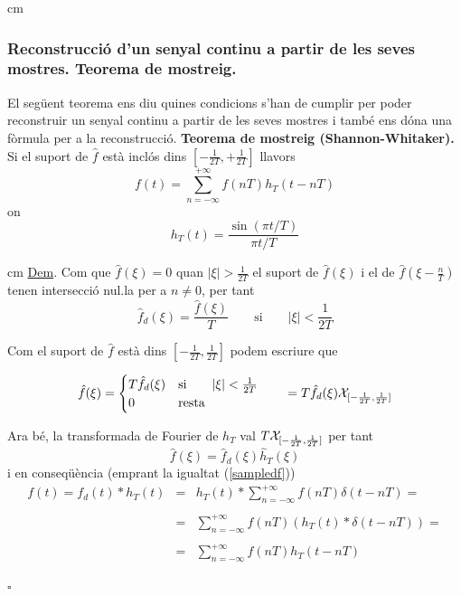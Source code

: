 \documentclass{article}
\begin{document}
 cm
\subsubsection{Reconstrucci\'o d'un senyal continu a partir de les
seves mostres. Teorema de mostreig.}
El seg\"uent teorema ens diu quines condicions s'han de cumplir per
poder reconstruir un senyal continu a partir de les seves mostres
i tamb\'e ens d\'ona una f\`ormula per a la reconstrucci\'o.
\newline
\noindent
\textbf{Teorema de mostreig (Shannon-Whitaker).} Si el suport de $\hat{f}$
est\`a incl\'os dins $[-\frac{1}{2T}, +\frac{1}{2T}]$ llavors
\begin{equation}
\label{shannonTh}
f(t)=\sum_{n=-\infty}^{+\infty} f(nT) h_T(t-nT)
\end{equation}
\noindent
on
\[
h_T(t)=\frac{\sin(\pi t / T)}{\pi t / T}
\]

 cm
\noindent
\underline{Dem}. Com que $\hat{f}(\xi)=0$ quan $|\xi| > \frac{1}{2T}$
el suport de $\hat{f}(\xi)$ i el de $\hat{f}(\xi-\frac{n}{T})$ tenen
intersecci\'o nul.la per a $n \neq 0$, per tant
\begin{equation}
\label{supfd}
\hat{f}_d(\xi)=\frac{\hat{f}(\xi)}{T} \qquad \mathrm{si} \qquad 
|\xi| < \frac{1}{2T}  
\end{equation}

\noindent
Com el suport de $\hat{f}$ est\`a dins $[-\frac{1}{2T}, \frac{1}{2T}]$
podem escriure que

\[
\hat{f}(\xi)=\begin{cases}
T \hat{f}_d(\xi) & \mathrm{si} \qquad |\xi| < \frac{1}{2T}  \\
0 & \mathrm{resta}
\end{cases} \qquad = T \hat{f}_d(\xi) {\cal X}_{[-\frac{1}{2T}, \frac{1}{2T}]}
\] 

\noindent
Ara b\'e, la transformada de Fourier de $h_T$ val 
$T {\cal X}_{[-\frac{1}{2T}, \frac{1}{2T}]}$ per tant
\[
\hat{f}(\xi)=\hat{f}_d(\xi) \hat{h}_T(\xi)
\] 
\noindent
i en conseq\"u\`encia (emprant la igualtat (\ref{sampledf}))
\[
\begin{array}{lcl}
f(t) = f_d(t) * h_T(t) &  = & 
h_T(t) * \sum_{n=-\infty}^{+\infty} f(nT) \delta(t-nT) =\\ \\
 & = & \sum_{n=-\infty}^{+\infty} f(nT) (h_T(t) * \delta(t-nT)) = \\ \\
 & = & \sum_{n=-\infty}^{+\infty} f(nT) h_T(t-nT)  
\end{array}
\]
\begin{flushright}
$\square$
\end{flushright}
\end{document}
